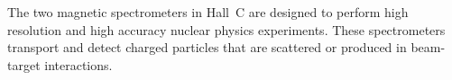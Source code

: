 


	The two magnetic spectrometers in Hall~C are designed to perform
high resolution and high accuracy nuclear physics experiments.  These
spectrometers transport and detect charged particles that are scattered or produced 
in beam-target interactions.
